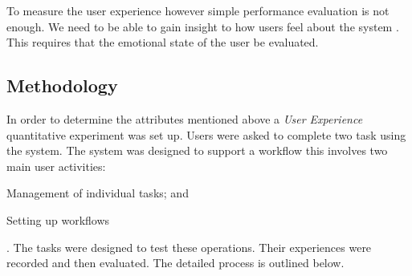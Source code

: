 \documentclass[12pt,a4paper]{report}
\begin{document}
To measure the user experience however simple performance evaluation is not
enough. We need to be able to gain insight to how users feel about the system
\cite{vermeeren2010user}. This requires that the emotional state of the user be
evaluated.

\subsection{Methodology}
In order to determine the attributes mentioned above a \emph{User Experience}
quantitative experiment was set up. Users were asked to complete two task using
the system. The system was designed to support a workflow this involves two main
user activities: \begin{inparaenum}[(i)] \item Management of individual tasks;
and \item Setting up workflows \end{inparaenum}. The tasks were designed to test
these operations. Their experiences were recorded and then evaluated. The detailed
process is outlined below.
\end{document}
